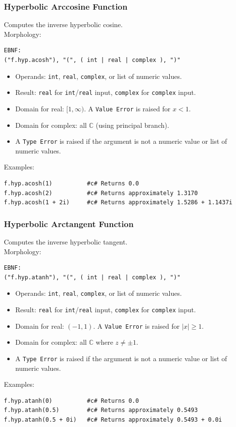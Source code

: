 \subsubsection{Hyperbolic Arccosine Function}
Computes the inverse hyperbolic cosine. \\
Morphology:
\begin{verbatim}
EBNF:
("f.hyp.acosh"), "(", ( int | real | complex ), ")"
\end{verbatim}
\begin{itemize}
\item Operands: \texttt{int}, \texttt{real}, \texttt{complex}, or list of numeric values.
\item Result: \texttt{real} for \texttt{int}/\texttt{real} input, \texttt{complex} for \texttt{complex} input.
\item Domain for real: $[1, \infty)$. A \texttt{Value Error} is raised for $x < 1$.
\item Domain for complex: all $\mathbb{C}$ (using principal branch).
\item A \texttt{Type Error} is raised if the argument is not a numeric value or list of numeric values.
\end{itemize}
Examples:
\begin{verbatim}
f.hyp.acosh(1)          #c# Returns 0.0
f.hyp.acosh(2)          #c# Returns approximately 1.3170
f.hyp.acosh(1 + 2i)     #c# Returns approximately 1.5286 + 1.1437i
\end{verbatim}

\subsubsection{Hyperbolic Arctangent Function}
Computes the inverse hyperbolic tangent. \\
Morphology:
\begin{verbatim}
EBNF:
("f.hyp.atanh"), "(", ( int | real | complex ), ")"
\end{verbatim}
\begin{itemize}
\item Operands: \texttt{int}, \texttt{real}, \texttt{complex}, or list of numeric values.
\item Result: \texttt{real} for \texttt{int}/\texttt{real} input, \texttt{complex} for \texttt{complex} input.
\item Domain for real: $(-1, 1)$. A \texttt{Value Error} is raised for $|x| \geq 1$.
\item Domain for complex: all $\mathbb{C}$ where $z \neq \pm 1$.
\item A \texttt{Type Error} is raised if the argument is not a numeric value or list of numeric values.
\end{itemize}
Examples:
\begin{verbatim}
f.hyp.atanh(0)          #c# Returns 0.0
f.hyp.atanh(0.5)        #c# Returns approximately 0.5493
f.hyp.atanh(0.5 + 0i)   #c# Returns approximately 0.5493 + 0.0i
\end{verbatim}

